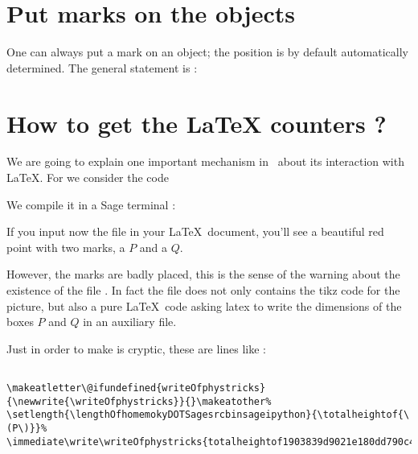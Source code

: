 \section{Put marks on the objects}

One can always put a mark on an object; the position is by default automatically determined. The general statement is :



\section{How to get the LaTeX counters ?}
\label{SECooKVXMooMKJAXV}

We are going to explain one important mechanism in \phystricks\ about its interaction with \LaTeX. For we consider the code



We compile it in a Sage terminal :



If you input now the file  in your \LaTeX\ document, you'll see a beautiful red point with two marks, a \( P\) and a \( Q\).  

\begin{center}
   
\end{center}

However, the marks are badly placed, this is the sense of the warning about the existence of the file . In fact the file  does not only contains the tikz code for the picture, but also a pure \LaTeX\ code asking latex to write the dimensions of the boxes \( P\) and \( Q\) in an auxiliary file.

Just in order to make is cryptic, these are lines like :
\begin{verbatim}

\makeatletter\@ifundefined{writeOfphystricks}{\newwrite{\writeOfphystricks}}{}\makeatother%
\setlength{\lengthOfhomemokyDOTSagesrcbinsageipython}{\totalheightof{\(P\)}}%
\immediate\write\writeOfphystricks{totalheightof1903839d9021e180dd790c4cc63081c63b2fe6f1:\the\lengthOfhomemokyDOTSagesrcbinsageipython-}
\end{verbatim}

